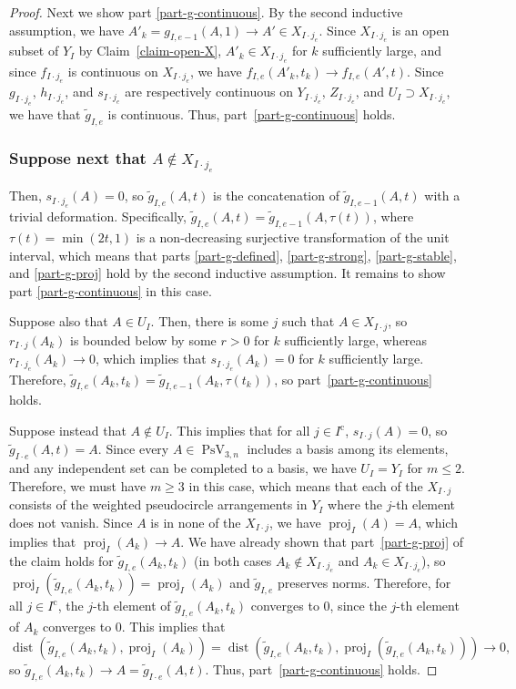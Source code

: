 \documentclass[JEP,XML,SOM,Unicode,NoFloatCountersInSection,published]{cedram}
\theoremstyle{remark}
\newcommand{\compl}[1]{{{#1}^{\text{c}}}}
\DeclareMathOperator{\dist}{dist}
\DeclareMathOperator{\pstief}{PsV}
\DeclareMathOperator{\proj}{proj}
\begin{document}
\begin{proof}
Next we show part \eqref{part-g-continuous}.
By the second inductive assumption, we have $A'_k = g_{I,e-1}(A,1) \to A' \in X_{I\cdot j_e}$.
Since $X_{I\cdot j_e}$ is an open subset of $Y_I$ by Claim~\ref{claim-open-X}, $A'_k \in X_{I\cdot j_e}$ for $k$ sufficiently large, and since $f_{I\cdot j_e}$ is continuous on $X_{I\cdot j_e}$, we have $f_{I,e}(A'_k,t_k) \to f_{I,e}(A',t)$.
Since $g_{I\cdot j_e}$, $h_{I\cdot j_e}$, and $s_{I\cdot j_e}$ are respectively continuous on $Y_{I\cdot j_e}$, $Z_{I\cdot j_e}$, and $U_{I} \supset X_{I\cdot j_e}$, we have that $\tilde g_{I,e}$ is continuous. Thus, part~\eqref{part-g-continuous} holds.

\subsubsection*{Suppose next that $A \not\in X_{I\cdot j_e}$}

Then, $s_{I\cdot j_e}(A) = 0$, so $\tilde g_{I,e}(A,t)$ is the concatenation of $\tilde g_{I,e-1}(A,t)$ with a trivial deformation.
Specifically, $\tilde g_{I,e}(A,t) = \tilde g_{I,e-1}(A,\tau(t))$, where $\tau(t) = \min(2t,1)$
is a non-decreasing surjective transformation of the unit interval, which means that parts \eqref{part-g-defined}, \eqref{part-g-strong}, \eqref{part-g-stable}, and \eqref{part-g-proj} hold by the second inductive assumption. It remains to show part \eqref{part-g-continuous} in this case.

Suppose also that $A \in U_I$. Then, there is some $j$ such that $A \in X_{I\cdot j}$, so $r_{I\cdot j}(A_k)$ is bounded below by some $r > 0$ for $k$ sufficiently large, whereas $r_{I\cdot j_e}(A_k) \to 0$, which implies that $s_{I\cdot j_e}(A_k) = 0$ for $k$ sufficiently large. Therefore, $\tilde g_{I,e}(A_k,t_k) = \tilde g_{I,e-1}(A_k,\tau(t_k))$, so part~\eqref{part-g-continuous} holds.

Suppose instead that $A \not\in U_I$.
This implies that for all $j \in \compl{I}$, $s_{I\cdot j}(A) = 0$, so $\tilde g_{I\cdot e}(A,t) = A$.
Since every $A \in \pstief_{3,n}$ includes a basis among its elements, and any independent set can be completed to a basis, we have $U_I = Y_I$ for $m \leq 2$. Therefore, we must have $m \geq 3$ in this case, which means that each of the $X_{I\cdot j}$ consists of the weighted pseudocircle arrangements in $Y_I$ where the $j$-th element does not vanish. Since $A$ is in none of the $X_{I\cdot j}$, we have $\proj_I(A) = A$, which implies that $\proj_I(A_k) \to A$.
We have already shown that part~\eqref{part-g-proj} of the claim holds for $\tilde g_{I,e}(A_k,t_k)$ (in both cases $A_k \not\in X_{I\cdot j_e}$ and $A_k \in X_{I\cdot j_e}$), so $\proj_I(\tilde g_{I,e}(A_k,t_k)) = \proj_I(A_k)$ and $\tilde g_{I,e}$ preserves norms. Therefore, for all $j \in \compl{I}$, the $j$-th element of $\tilde g_{I,e}(A_k,t_k)$ converges to 0, since the $j$-th element of $A_k$ converges to 0. This implies that \[ \dist(\tilde g_{I,e}(A_k,t_k),\proj_I(A_k)) = \dist(\tilde g_{I,e}(A_k,t_k),\proj_I(\tilde g_{I,e}(A_k,t_k))) \to 0, \]
so $\tilde g_{I,e}(A_k,t_k) \to A = \tilde g_{I\cdot e}(A,t)$.
Thus, part~\eqref{part-g-continuous} holds.


\end{proof}
\end{document}

